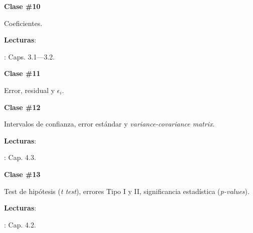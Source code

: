 \documentclass[letterpaper]{article}
\renewenvironment{itemize}{
  \begin{list}{}{
    \setlength{\leftmargin}{1.5em}
  }
}{
  \end{list}
}
\begin{document}
\begin{enumerate}
			\begin{itemize} 
				\item[$\bullet$] {\bf Clase \#10}
					\begin{itemize} 
						\item[$\circ$] Coeficientes. %
						\item[$\circ$] {\bf Lecturas}: 
							\begin{itemize}
								\item[$\diamond$] \textcite{Wooldridge2010}: Caps. 3.1---3.2.
							\end{itemize}
					\end{itemize}
			\end{itemize}



			\begin{itemize} 
				\item[$\bullet$] {\bf Clase \#11}
					\begin{itemize} 
						\item[$\circ$] Error, residual y $\epsilon_{i}$.
					\end{itemize}
			\end{itemize}



			\begin{itemize} 
				\item[$\bullet$] {\bf Clase \#12}
					\begin{itemize} 
						\item[$\circ$] Intervalos de confianza, error est\'andar y \emph{variance-covariance matrix}. %
						\item[$\circ$] {\bf Lecturas}: 
							\begin{itemize}
								\item[$\diamond$] \textcite{Wooldridge2010}: Cap. 4.3.
							\end{itemize}
					\end{itemize}
			\end{itemize}



			\begin{itemize} 
				\item[$\bullet$] {\bf Clase \#13}
					\begin{itemize} 
						\item[$\circ$] Test de hip\'otesis (\emph{t test}), errores Tipo I y II,  significancia estad\'istica (\emph{p-values}). 
						\item[$\circ$] {\bf Lecturas}: 
							\begin{itemize}
								\item[$\diamond$] \textcite{Wooldridge2010}: Cap. 4.2.
							\end{itemize}
					\end{itemize}
			\end{itemize}




\end{enumerate}
\end{document}
